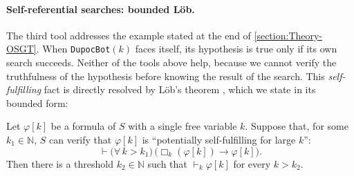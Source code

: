 \documentclass[twoside,11pt]{article}
\begin{document}
\paragraph{Self-referential searches: bounded Löb.}
The third tool addresses the example stated at the end of \cref{section:Theory-OSGT}. When \texttt{DupocBot}$(k)$ faces itself, its hypothesis is true only if its own search succeeds. Neither of the tools above help, because we cannot verify the truthfulness of the hypothesis before knowing the result of the search. This \emph{self-fulfilling} fact is directly resolved by Löb's theorem \citep{Lob1955}, which we state in its bounded form:

\begin{theorem}\label{thm:pblt}
Let $\varphi[k]$ be a formula of $S$ with a single free variable $k$. Suppose that, for some $k_1\in\mathbb{N}$, $S$ can verify that $\varphi[k]$ is \enquote{potentially self-fulfilling for large $k$}:
\[
  \vdash \big(\forall\, k>k_1\big)\, \big(\Box_{k}(\varphi[k]) \to \varphi[k]\big).
\]
Then there is a threshold $k_2 \in \mathbb{N}$ such that $\vdash_k \varphi[k]$ for every $k > k_2$.
\end{theorem}
\end{document}
